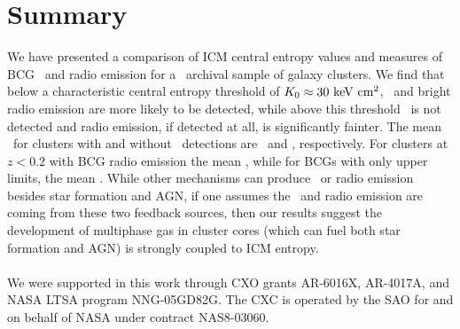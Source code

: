 \documentclass{emulateapj}
\begin{document}
\section{Summary}
\label{sec:diss}

We have presented a comparison of ICM central entropy values and
measures of BCG \halpha\ and radio emission for a \Chandra\ archival
sample of galaxy clusters. We find that below a characteristic central
entropy threshold of $K_0 \approx 30 \mathrm{\mbox{\ensuremath{\mathrm{~keV}}} \mathrm{\mbox{\ensuremath{\mathrm{~cm}}}^2}}$, \halpha\ and bright radio
emission are more likely to be detected, while above this threshold
\halpha\ is not detected and radio emission, if detected at all, is
significantly fainter. The mean \kna\ for clusters with and without
\halpha\ detections are \fha\ and \nfha, respectively. For clusters at
$z < 0.2$ with BCG radio emission the mean \frad, while for BCGs with
only upper limits, the mean \nfrad. While other mechanisms can produce
\halpha\ or radio emission besides star formation and AGN, if one
assumes the \halpha\ and radio emission are coming from these two
feedback sources, then our results suggest the development of
multiphase gas in cluster cores (which can fuel both star formation
and AGN) is strongly coupled to ICM entropy.\\\\


We were supported in this work through CXO grants AR-6016X, AR-4017A,
and NASA LTSA program NNG-05GD82G. The CXC is operated by the SAO for
and on behalf of NASA under contract NAS8-03060.


\end{document}
